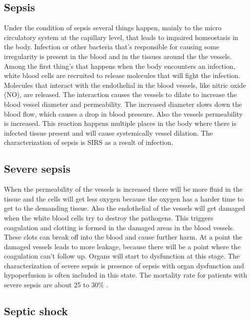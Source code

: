 \subsection{Sepsis}

Under the condition of sepsis several things happen, mainly to the micro circulatory system at the capillary level, that leads to impaired homeostasis in the body. Infection or other bacteria that’s responsible for causing some irregularity is present in the blood and in the tissues around the the vessels. Among the first thing’s that happens when the body encounters an infection, white blood cells are recruited to release molecules that will fight the infection. Molecules that interact with the endothelial in the blood vessels, like nitric oxide (NO), are released. The interaction causes the vessels to dilate to increase the blood vessel diameter and permeability. The increased diameter slows down the blood flow, which causes a drop in blood pressure. Also the vessels permeability is increased. This reaction happens multiple places in the body where there is infected tissue present and will cause systemically vessel dilation. The characterization of sepsis is SIRS as a result of infection. \cite{baudouin2008,kanta2014}

\subsection{Severe sepsis}

When the permeability of the vessels is increased there will be more fluid in the tissue and the cells will get less oxygen because the oxygen has a harder time to get to the demanding tissue. Also the endothelial of the vessels will get damaged when the white blood cells try to destroy the pathogens. This triggers coagulation and clotting is formed in the damaged areas in the blood vessels. These clots can break off into the blood and cause further harm. At a point the damaged vessels leads to more leakage, because there will be a point where the coagulation can’t follow up. Organs will start to dysfunction at this stage. The characterization of severe sepsis is presence of sepsis with organ dysfunction and hypoperfusion is often included in this state. The mortality rate for patients with severe sepsis are about 25 to 30\% \cite{baudouin2008,kanta2014}. 

\subsection{Septic shock}

